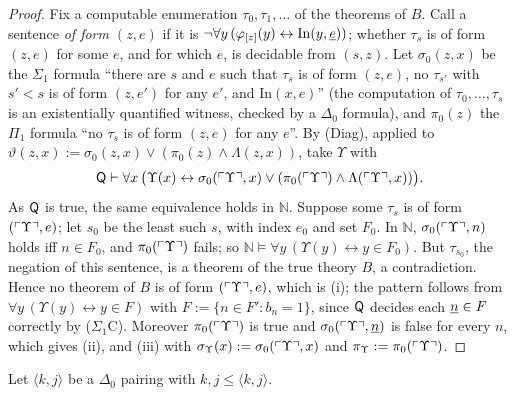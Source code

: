 \begin{proof}
Fix a computable enumeration $\tau_0,\tau_1,\dots$ of the theorems of $B$. Call a sentence \emph{of form $(z,e)$} if it is $\neg\forall y\,(\varphi_{[z]}(y)\leftrightarrow\mathrm{In}(y,\underline{e}))$; whether $\tau_s$ is of form $(z,e)$ for some $e$, and for which $e$, is decidable from $(s,z)$. Let $\sigma_0(z,x)$ be the $\Sigma_1$ formula ``there are $s$ and $e$ such that $\tau_s$ is of form $(z,e)$, no $\tau_{s'}$ with $s'<s$ is of form $(z,e')$ for any $e'$, and $\mathrm{In}(x,e)$'' (the computation of $\tau_0,\dots,\tau_s$ is an existentially quantified witness, checked by a $\Delta_0$ formula), and $\pi_0(z)$ the $\Pi_1$ formula ``no $\tau_s$ is of form $(z,e)$ for any $e$''. By (Diag), applied to $\vartheta(z,x):=\sigma_0(z,x)\vee(\pi_0(z)\wedge\Lambda(z,x))$, take $\Upsilon$ with
\[
\mathsf{Q}\vdash\forall x\,\big(\Upsilon(x)\leftrightarrow\sigma_0(\ulcorner \Upsilon\urcorner,x)\vee(\pi_0(\ulcorner \Upsilon\urcorner)\wedge\Lambda(\ulcorner \Upsilon\urcorner,x))\big).
\]
As $\mathsf{Q}$ is true, the same equivalence holds in $\mathbb N$. Suppose some $\tau_s$ is of form $(\ulcorner \Upsilon\urcorner,e)$; let $s_0$ be the least such $s$, with index $e_0$ and set $F_0$. In $\mathbb N$, $\sigma_0(\ulcorner \Upsilon\urcorner,n)$ holds iff $n\in F_0$, and $\pi_0(\ulcorner \Upsilon\urcorner)$ fails; so $\mathbb N\models\forall y\,(\Upsilon(y)\leftrightarrow y\in F_0)$. But $\tau_{s_0}$, the negation of this sentence, is a theorem of the true theory $B$, a contradiction. Hence no theorem of $B$ is of form $(\ulcorner \Upsilon\urcorner,e)$, which is (i); the pattern follows from $\forall y\,(\Upsilon(y)\leftrightarrow y\in F)$ with $F:=\{n\in F':b_n=1\}$, since $\mathsf{Q}$ decides each $\underline{n}\in F$ correctly by ($\Sigma_1$C). Moreover $\pi_0(\ulcorner \Upsilon\urcorner)$ is true and $\sigma_0(\ulcorner \Upsilon\urcorner,\underline{n})$ is false for every $n$, which gives (ii), and (iii) with $\sigma_\Upsilon(x):=\sigma_0(\ulcorner \Upsilon\urcorner,x)$ and $\pi_\Upsilon:=\pi_0(\ulcorner \Upsilon\urcorner)$.
\end{proof}

Let $\langle k,j\rangle$ be a $\Delta_0$ pairing with $k,j\le\langle k,j\rangle$.

